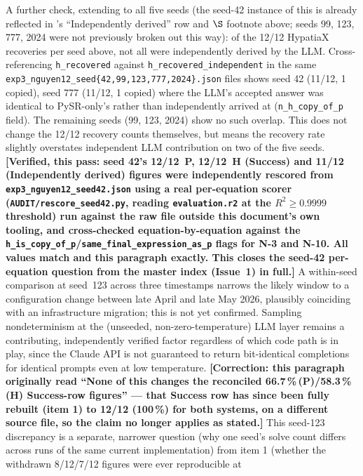 \documentclass[twoside,11pt]{article}
\newcommand{\Rsq}{R^{2}}
\begin{document}
A further check, extending to all five seeds (the seed-42 instance of this
is already reflected in 's ``Independently derived''
row and $\S$ footnote above; seeds 99, 123, 777, 2024 were not previously
broken out this way): of the 12/12 HypatiaX recoveries per seed above,
not all were independently derived by the LLM. Cross-referencing
\texttt{h\_recovered} against \texttt{h\_recovered\_independent} in the
same \texttt{exp3\_nguyen12\_seed\{42,99,123,777,2024\}.json} files shows
seed 42 (11/12, 1 copied), seed 777 (11/12, 1 copied) where the LLM's
accepted answer was identical to PySR-only's rather than independently
arrived at (\texttt{n\_h\_copy\_of\_p} field). The remaining seeds (99,
123, 2024) show no such overlap. This does not change the 12/12 recovery
counts themselves, but means the recovery rate slightly overstates
independent LLM contribution on two of the five seeds. \textbf{[Verified,
this pass: seed 42's 12/12~P, 12/12~H (Success) and 11/12 (Independently
derived) figures were independently rescored from
\texttt{exp3\_nguyen12\_seed42.json} using a real per-equation scorer
(\texttt{AUDIT/rescore\_seed42.py}, reading \texttt{evaluation.r2} at the
$\Rsq\ge0.9999$ threshold) run against the raw file outside this
document's own tooling, and cross-checked equation-by-equation against
the \texttt{h\_is\_copy\_of\_p}/\texttt{same\_final\_expression\_as\_p}
flags for N-3 and N-10. All values match  and this
paragraph exactly. This closes the seed-42 per-equation question from
the master index (Issue~1) in full.]}
A within-seed comparison at seed~123 across three
timestamps narrows the likely window to a configuration change between
late April and late May 2026, plausibly coinciding with an infrastructure
migration; this is not yet confirmed. Sampling nondeterminism at the
(unseeded, non-zero-temperature) LLM layer remains a contributing,
independently verified factor regardless of which code path is in play,
since the Claude API is not guaranteed to return bit-identical completions
for identical prompts even at low temperature. \textbf{[Correction: this
paragraph originally read ``None of this changes the reconciled
66.7\,\%\,(P)/58.3\,\%\,(H) Success-row figures'' --- that Success row has
since been fully rebuilt (item 1) to 12/12 (100\,\%) for both systems, on
a different source file, so the claim no longer applies as stated.]} This
seed-123 discrepancy is a separate, narrower question (why one seed's
solve count differs across runs of the same current implementation) from
item 1 (whether the withdrawn 8/12/7/12 figures were ever reproducible at
\end{document}
